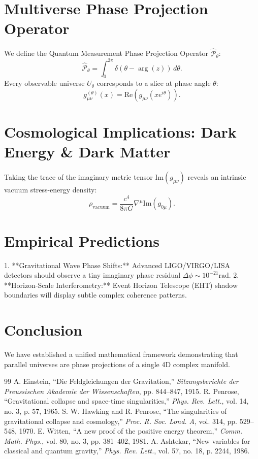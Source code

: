 \documentclass[journal,twocolumn]{IEEEtran}
\begin{document}
\section{Multiverse Phase Projection Operator}
We define the Quantum Measurement Phase Projection Operator $\hat{\mathcal{P}}_{\theta}$:
\begin{equation}
\hat{\mathcal{P}}_{\theta} = \int_{0}^{2\pi} \delta(\theta - \arg(z)) \, d\theta.
\end{equation}
Every observable universe $U_\theta$ corresponds to a slice at phase angle $\theta$:
\begin{equation}
g_{\mu\nu}^{(\theta)}(x) = \text{Re}\left( g_{\mu\nu}(x e^{i\theta}) \right).
\end{equation}

\section{Cosmological Implications: Dark Energy \& Dark Matter}
Taking the trace of the imaginary metric tensor $\text{Im}(g_{\mu\nu})$ reveals an intrinsic vacuum stress-energy density:
\begin{equation}
\rho_{\text{vacuum}} = \frac{c^4}{8\pi G} \nabla^\mu \text{Im}(g_{0\mu}).
\end{equation}

\section{Empirical Predictions}
1. **Gravitational Wave Phase Shifts:** Advanced LIGO/VIRGO/LISA detectors should observe a tiny imaginary phase residual $\Delta \phi \sim 10^{-21} \text{rad}$.
2. **Horizon-Scale Interferometry:** Event Horizon Telescope (EHT) shadow boundaries will display subtle complex coherence patterns.

\section{Conclusion}
We have established a unified mathematical framework demonstrating that parallel universes are phase projections of a single 4D complex manifold.

\begin{thebibliography}{99}
 A. Einstein, ``Die Feldgleichungen der Gravitation,'' \emph{Sitzungsberichte der Preussischen Akademie der Wissenschaften}, pp. 844--847, 1915.
 R. Penrose, ``Gravitational collapse and space-time singularities,'' \emph{Phys. Rev. Lett.}, vol. 14, no. 3, p. 57, 1965.
 S. W. Hawking and R. Penrose, ``The singularities of gravitational collapse and cosmology,'' \emph{Proc. R. Soc. Lond. A}, vol. 314, pp. 529--548, 1970.
 E. Witten, ``A new proof of the positive energy theorem,'' \emph{Comm. Math. Phys.}, vol. 80, no. 3, pp. 381--402, 1981.
 A. Ashtekar, ``New variables for classical and quantum gravity,'' \emph{Phys. Rev. Lett.}, vol. 57, no. 18, p. 2244, 1986.
\end{thebibliography}
\end{document}
